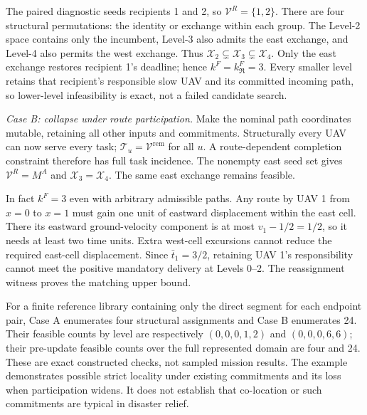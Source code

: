 The paired diagnostic seeds recipients 1 and 2, so
$\mathcal V^R=\{1,2\}$. There are four structural permutations: the
identity or exchange within each group. The Level-2 space contains only
the incumbent, Level-3 also admits the east exchange, and Level-4 also
permits the west exchange. Thus
$\mathcal X_2\subsetneq\mathcal X_3\subsetneq\mathcal X_4$.
Only the east exchange restores recipient 1's deadline; hence
$k^F=k_{\mathfrak R}^F=3$. Every smaller level retains that recipient's
responsible slow UAV and its committed incoming path, so lower-level
infeasibility is exact, not a failed candidate search.

\emph{Case B: collapse under route participation.}
Make the nominal path coordinates mutable, retaining all other inputs
and commitments. Structurally every UAV can now serve every task;
$\mathcal T_u=\mathcal V^{\mathrm{rem}}$ for all $u$. A route-dependent
completion constraint therefore has full task incidence. The nonempty
east seed set gives $\mathcal V^R=M^A$ and
$\mathcal X_3=\mathcal X_4$. The same east exchange remains feasible.

In fact $k^F=3$ even with arbitrary admissible paths. Any route by UAV 1
from $x=0$ to $x=1$ must gain one unit of eastward displacement within
the east cell. There its eastward ground-velocity component is at most
$v_1-1/2=1/2$, so it needs at least two time units. Extra west-cell
excursions cannot reduce the required east-cell displacement. Since
$\bar t_1=3/2$, retaining UAV 1's responsibility cannot meet the positive
mandatory delivery at Levels 0--2. The reassignment witness proves the
matching upper bound.

For a finite reference library containing only the direct segment for
each endpoint pair, Case A enumerates four structural assignments and
Case B enumerates 24. Their feasible counts by level are respectively
$(0,0,0,1,2)$ and $(0,0,0,6,6)$; their pre-update feasible counts over
the full represented domain are four and 24. These are exact constructed
checks, not sampled mission results. The example demonstrates possible
strict locality under existing commitments and its loss when participation
widens. It does not establish that co-location or such commitments are
typical in disaster relief.
